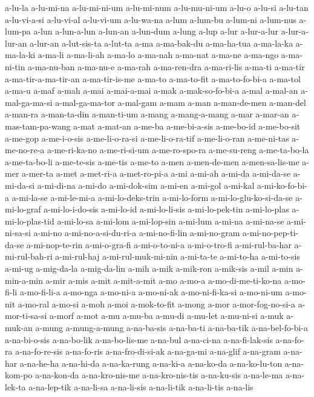{a-lu-la a-lu-mi-na a-lu-mi-ni-um a-lu-mi-num a-lu-mu-ni-um a-lu-o a-lu-si
a-lu-tan a-lu-vi-a-si a-lu-vi-al a-lu-vi-um a-lu-wa-na a-lum a-lum-bu
a-lum-ni a-lum-nus a-lum-pa a-lun a-lun-a-lun a-lun-an a-lun-dum a-lung
a-lup a-lur a-lur-a-lur a-lur-a-lur-an a-lur-an a-lut-sis-ta a-lut-ta a-ma
a-ma-bak-du a-ma-ha-tua a-ma-la-ka a-ma-la-ki a-ma-li a-ma-li-ah a-ma-lo
a-ma-nah a-ma-nat a-ma-ne a-ma-ngo a-ma-ni-tin a-ma-nu-ban a-ma-nu-e
a-ma-rah a-ma-ren-dra a-ma-ri-lis a-ma-ti a-ma-tir a-ma-tir-a-ma-tir-an
a-ma-tir-is-me a-ma-to a-ma-to-fit a-ma-to-fo-bi-a a-ma-tol a-ma-u a-maf
a-mah a-mai a-mai-a-mai a-mak a-mak-so-fo-bi-a a-mal a-mal-an
a-mal-ga-ma-si a-mal-ga-ma-tor a-mal-gam a-mam a-man a-man-de-men
a-man-del a-man-ra a-man-ta-din a-man-ti-um a-mang a-mang-a-mang a-mar
a-mar-an a-mas-tam-pa-wang a-mat a-mat-an a-me-ba a-me-bi-a-sis a-me-bo-id
a-me-bo-sit a-me-gop a-me-i-o-sis a-me-li-o-ra-si a-me-li-o-ra-tif
a-me-li-o-ran a-me-ni-tas a-me-no-re-a a-me-ri-ka-no a-me-ri-si-um
a-me-ro-spo-ra a-me-su-reng a-me-ta-bo-la a-me-ta-bo-li a-me-te-sis
a-me-tis a-me-to a-men a-men-de-men a-men-sa-lis-me a-mer a-mer-ta a-met
a-met-ri-a a-met-ro-pi-a a-mi a-mi-ah a-mi-da a-mi-da-se a-mi-da-si
a-mi-di-na a-mi-do a-mi-dok-sim a-mi-en a-mi-gol a-mi-kal a-mi-ko-fo-bi-a
a-mi-la-se a-mi-le-mi-a a-mi-lo-deks-trin a-mi-lo-form
a-mi-lo-glu-ko-si-da-se a-mi-lo-graf a-mi-lo-i-do-sis a-mi-lo-id
a-mi-lo-li-sis a-mi-lo-pek-tin a-mi-lo-plas a-mi-lo-plas-tid a-mi-lo-sa
a-mi-lom a-mi-lop-sin a-mi-lum a-mi-na a-mi-na-se a-mi-ni-sa-si a-mi-no
a-mi-no-a-si-du-ri-a a-mi-no-fi-lin a-mi-no-gram a-mi-no-pep-ti-da-se
a-mi-nop-te-rin a-mi-o-gra-fi a-mi-o-to-ni-a a-mi-o-tro-fi a-mi-rul-ba-har
a-mi-rul-bah-ri a-mi-rul-haj a-mi-rul-muk-mi-nin a-mi-ta-te a-mi-to-ha
a-mi-to-sis a-mi-ug a-mig-da-la a-mig-da-lin a-mih a-mik a-mik-ron
a-mik-sis a-mil a-min a-min-a-min a-mir a-mis a-mit a-mit-a-mit a-mo
a-mo-a a-mo-di-me-ti-ko-na a-mo-fi-li a-mo-fi-li-a a-mo-nga a-mo-ni-a
a-mo-ni-ak a-mo-ni-fi-ka-si a-mo-ni-um a-mo-nit a-mo-ral a-mo-si a-moh
a-moi a-mok-to-fit a-mong a-mor a-mor-fog-no-si-a a-mor-ti-sa-si a-morf
a-mot a-mu a-mu-ba a-mu-di a-mu-let a-mu-ni-si a-muk a-muk-an a-mung
a-mung-a-mung a-na-ba-sis a-na-ba-ti a-na-ba-tik a-na-bel-fo-bi-a
a-na-bi-o-sis a-na-bo-lik a-na-bo-lis-me a-na-bul a-na-ci-na
a-na-fi-lak-sis a-na-fo-ra a-na-fo-re-sis a-na-fo-ris a-na-fro-di-si-ak
a-na-ga-mi a-na-glif a-na-gram a-na-har a-na-he-ha a-na-hi-da a-na-ka-rung
a-na-ki-a a-na-ko-da a-na-ko-lu-ton a-na-kom-po a-na-kon-da
a-na-kro-nis-me a-na-kro-nis-tis a-na-ku-sis a-na-le-ma a-na-lek-ta
a-na-lep-tik a-na-li-sa a-na-li-sis a-na-li-tik a-na-li-tis a-na-lis
}
